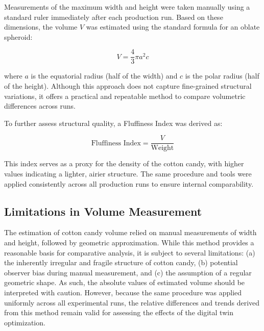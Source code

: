 Measurements of the maximum width and height were taken manually using a standard ruler immediately after each production run. Based on these dimensions, the volume \( V \) was estimated using the standard formula for an oblate spheroid:

\[
V = \frac{4}{3} \pi a^2 c
\]

where \( a \) is the equatorial radius (half of the width) and \( c \) is the polar radius (half of the height). Although this approach does not capture fine-grained structural variations, it offers a practical and repeatable method to compare volumetric differences across runs.

To further assess structural quality, a Fluffiness Index was derived as:

\[
\text{Fluffiness Index} = \frac{V}{\text{Weight}}
\]

This index serves as a proxy for the density of the cotton candy, with higher values indicating a lighter, airier structure. The same procedure and tools were applied consistently across all production runs to ensure internal comparability.

\subsection{Limitations in Volume Measurement}

The estimation of cotton candy volume relied on manual measurements of width and height, followed by geometric approximation. While this method provides a reasonable basis for comparative analysis, it is subject to several limitations: (a) the inherently irregular and fragile structure of cotton candy, (b) potential observer bias during manual measurement, and (c) the assumption of a regular geometric shape. As such, the absolute values of estimated volume should be interpreted with caution. However, because the same procedure was applied uniformly across all experimental runs, the relative differences and trends derived from this method remain valid for assessing the effects of the digital twin optimization.
